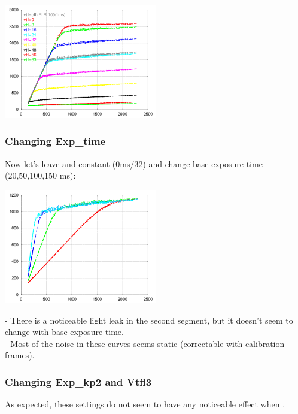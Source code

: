 {\begin{center}
\includegraphics[height=5cm]{images/100-1-x-plr-vs-30ms-lin}
\end{center}

\subsubsection{Changing Exp\_time}

Now let's leave  and  constant (0ms/32) and change base exposure time (20,50,100,150 ms):\\

\begin{center}
\includegraphics[height=5cm]{images/x-0-32-plr-vs-30ms-lin}
\end{center}

- There is a noticeable light leak in the second segment, but it doesn't seem to change with base exposure time.\\
- Most of the noise in these curves seems static (correctable with calibration frames). \\

\subsubsection{Changing Exp\_kp2 and Vtfl3}

As expected, these settings do not seem to have any noticeable effect when . 


}

